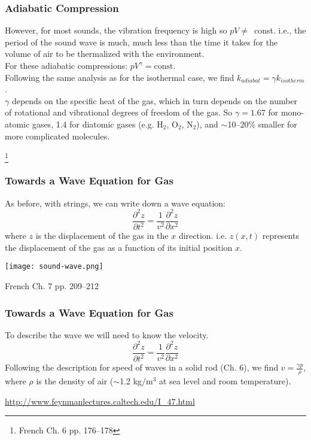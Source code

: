 \documentclass[pdf, handout, hideothersubsections]{beamer}
\begin{document}
\begin{frame}
\frametitle{Adiabatic Compression}
However, for most sounds, the vibration frequency is high so $p V \ne $~const. i.e., the period of the sound wave is much, much less than
the time it takes for the volume of air to be thermalized with the environment. \\
\pause
For these adiabatic compressions: $p V^{\gamma} = \mathrm{const}$. \\
\pause
Following the same analysis as for the isothermal case\footnotemark, we find
$k_{adiabat}=\gamma k_{isotherm}$.\\
\pause
$\gamma$ depends on the specific heat of the gas, which in turn
depends on the number of rotational and vibrational degrees of freedom
of the gas. \pause So $\gamma = 1.67$ for mono-atomic gases, 1.4 for diatomic
gases (e.g. H$_2$, O$_2$, N$_2$), and $\sim$10--20\% smaller for more
complicated molecules.

\footnote[1]{French Ch. 6 pp. 176--178}
\end{frame}


\begin{frame}
\frametitle{Towards a Wave Equation for Gas}
As before, with strings, we can write down a wave equation:
\begin{equation}
\frac{\partial^2 z}{\partial t^2} = \frac{1}{v^2}\frac{\partial^2 z}{\partial x^2}
\end{equation}
where $z$ is the displacement of the gas in the $x$
direction. i.e. $z(x, t)$ represents the displacement of the gas as a
function of its initial position $x$.


\centering
\texttt{[image: sound-wave.png]}

French Ch. 7 pp. 209--212
\end{frame}


\begin{frame}
\frametitle{Towards a Wave Equation for Gas}
To describe the wave we will need to know the velocity.
\begin{equation}
\frac{\partial^2 z}{\partial t^2} = \frac{1}{v^2}\frac{\partial^2 z}{\partial x^2}
\end{equation}
Following the description for speed of waves in a solid rod (Ch. 6),
we find $v = \frac{\gamma p}{\rho}$, where $\rho$ is the density of
air ($\sim$1.2 kg/m$^3$ at sea level and room temperature).

\url{http://www.feynmanlectures.caltech.edu/I_47.html}
\end{frame}
\end{document}
